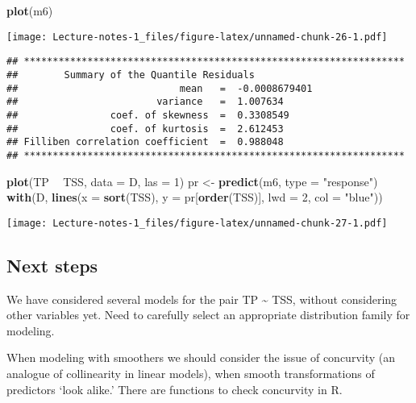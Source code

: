 \documentclass[
]{book}
\newenvironment{Shaded}{\begin{snugshade}}{\end{snugshade}}
\newcommand{\DataTypeTok}[1]{\textcolor[rgb]{0.13,0.29,0.53}{#1}}
\newcommand{\DecValTok}[1]{\textcolor[rgb]{0.00,0.00,0.81}{#1}}
\newcommand{\KeywordTok}[1]{\textcolor[rgb]{0.13,0.29,0.53}{\textbf{#1}}}
\newcommand{\NormalTok}[1]{#1}
\newcommand{\OperatorTok}[1]{\textcolor[rgb]{0.81,0.36,0.00}{\textbf{#1}}}
\newcommand{\StringTok}[1]{\textcolor[rgb]{0.31,0.60,0.02}{#1}}
\begin{document}
\begin{Shaded}
\begin{Highlighting}[]
\KeywordTok{plot}\NormalTok{(m6)}
\end{Highlighting}
\end{Shaded}

\texttt{[image: Lecture-notes-1\_files/figure-latex/unnamed-chunk-26-1.pdf]}

\begin{verbatim}
## ******************************************************************
##        Summary of the Quantile Residuals
##                            mean   =  -0.0008679401 
##                        variance   =  1.007634 
##                coef. of skewness  =  0.3308549 
##                coef. of kurtosis  =  2.612453 
## Filliben correlation coefficient  =  0.988048 
## ******************************************************************
\end{verbatim}

\begin{Shaded}
\begin{Highlighting}[]
\KeywordTok{plot}\NormalTok{(TP }\OperatorTok{~}\StringTok{ }\NormalTok{TSS, }\DataTypeTok{data =}\NormalTok{ D, }\DataTypeTok{las =} \DecValTok{1}\NormalTok{)}
\NormalTok{pr <-}\StringTok{ }\KeywordTok{predict}\NormalTok{(m6, }\DataTypeTok{type =} \StringTok{"response"}\NormalTok{)}
\KeywordTok{with}\NormalTok{(D, }\KeywordTok{lines}\NormalTok{(}\DataTypeTok{x =} \KeywordTok{sort}\NormalTok{(TSS), }\DataTypeTok{y =}\NormalTok{ pr[}\KeywordTok{order}\NormalTok{(TSS)],}
              \DataTypeTok{lwd =} \DecValTok{2}\NormalTok{, }\DataTypeTok{col =} \StringTok{"blue"}\NormalTok{))}
\end{Highlighting}
\end{Shaded}

\texttt{[image: Lecture-notes-1\_files/figure-latex/unnamed-chunk-27-1.pdf]}

\hypertarget{next-steps}{%
\subsection{Next steps}\label{next-steps}}

We have considered several models for the pair TP \textasciitilde{} TSS, without considering other variables yet. Need to carefully select an appropriate distribution family for modeling.

When modeling with smoothers we should consider the issue of concurvity (an analogue of collinearity in linear models), when smooth transformations of predictors `look alike.' There are functions to check concurvity in R.
\end{document}
